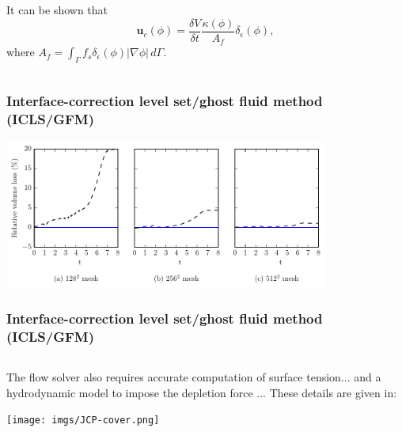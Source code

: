 \begin{frame}[t]
\begin{columns}[T]
\begin{column}{0.5\textwidth}
{\begin{bluecolorbox}
        It can be shown that
        \begin{equation}
          {\bm u}_c(\phi) = \frac{\delta V}{\delta t} \frac{\kappa(\phi)}{A_f} \delta_\epsilon (\phi),
        \end{equation}
        where $A_f = \int_\Gamma f_s \delta_\epsilon (\phi)|\nabla \phi| \,d\Gamma$.
        
      \end{bluecolorbox}
      } %
    \end{column}
    
  \end{columns}

\end{frame}
\begin{frame}[noframenumbering]
  \frametitle{Interface-correction level set/ghost fluid method (ICLS/GFM)}

  \centering
  \includegraphics[width=0.8\textwidth]{../paper1/Figures/serp_loss.pdf}
  \vskip0.3cm
  \pause

\end{frame}
\begin{frame}[noframenumbering]
  \frametitle{Interface-correction level set/ghost fluid method (ICLS/GFM)}

  \begin{columns}[T]
    
    \begin{column}{\textwidth}
      The flow solver also requires accurate computation of surface tension... \vskip0.2cm
      and a hydrodynamic model to impose the depletion force ... \vskip0.2cm
      \pause
      These details are given in: \vskip0.5cm
      \centering
      \begin{tcolorbox}[beamer,
          width=0.7\textwidth,
          arc=0pt,
          boxsep=1pt,
          left=0pt,right=0pt,top=0pt,bottom=0pt,
        ]
        \texttt{[image: imgs/JCP-cover.png]}
      \end{tcolorbox}
    \end{column}
  \end{columns}

\end{frame}  
